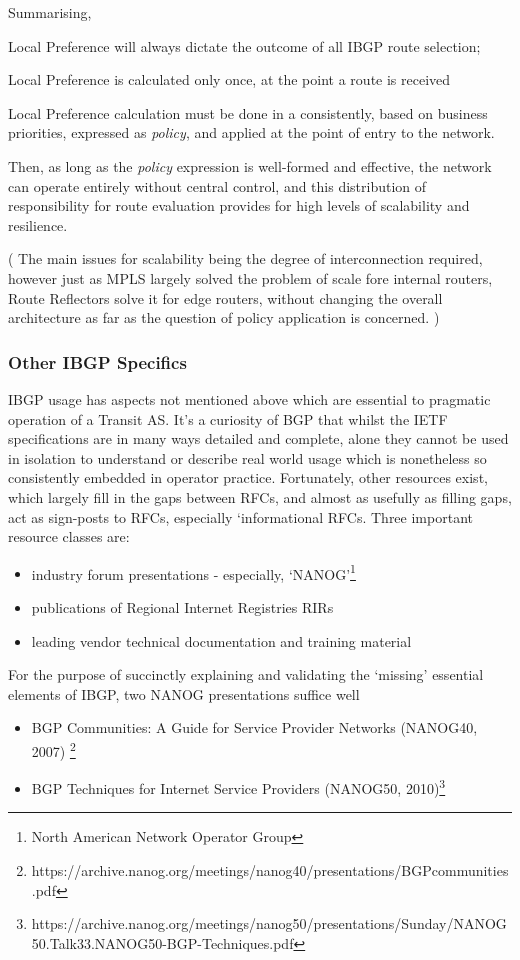 Summarising,
\begin{myitemize}
	\item Local Preference will always dictate the outcome of all IBGP route selection;
	\item  Local Preference is calculated only once, at the point a route is received
	\item Local Preference calculation must be done in a consistently, based on business priorities, expressed as \textit{policy}, and applied at the point of entry to the network.
\end{myitemize}

Then, as long as the \textit{policy} expression is well-formed and effective, 
the network can operate entirely without central control, and this distribution
of responsibility for route evaluation provides for high levels of scalability
and resilience.

( The main issues for scalability being the degree of interconnection required,
however just as MPLS largely solved the problem of scale fore internal routers,
Route Reflectors solve it for edge routers, without changing the overall
architecture as far as the question of policy application is concerned. )

\subsubsection{Other IBGP Specifics}
IBGP usage has aspects not mentioned above which are essential to pragmatic operation of a Transit AS.  It's a curiosity of BGP that whilst the IETF specifications are in many ways detailed and complete, alone they cannot be used in isolation to understand or describe real world usage which is nonetheless so consistently embedded in operator practice.
Fortunately, other resources exist, which largely fill in the gaps between RFCs, and almost as usefully as filling gaps, act as sign-posts to RFCs, especially `informational RFCs.
Three important resource classes are:
\begin{itemize}
	\item industry forum presentations - especially, `NANOG'\footnote{North American Network Operator Group}
	\item publications of Regional Internet Registries RIRs
	\item leading vendor technical documentation and training material
\end{itemize}

For the purpose of succinctly explaining and validating the `missing' essential elements of IBGP, two NANOG presentations suffice well
\begin{itemize}
	\item BGP Communities: A Guide for Service Provider Networks (NANOG40, 2007) \footnote{https://archive.nanog.org/meetings/nanog40/presentations/BGPcommunities.pdf}
	\item BGP Techniques for Internet Service Providers (NANOG50, 2010)\footnote{https://archive.nanog.org/meetings/nanog50/presentations/Sunday/NANOG50.Talk33.NANOG50-BGP-Techniques.pdf}
\end{itemize}

